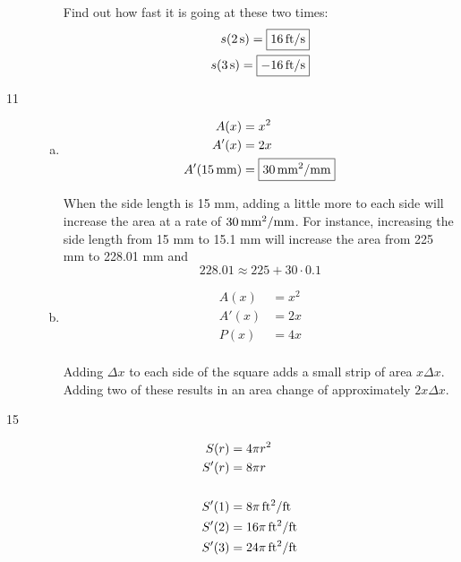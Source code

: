 \documentclass[letterpaper, landscape]{exam}
\begin{document}
\begin{description}
\begin{enumerate}[(a)]
          Find out how fast it is going at these two times:
          \begin{align*}
            s(\unit[2]{s}) = \boxed{ \unit[16]{ft/s} } \\
            s(\unit[3]{s}) = \boxed{ \unit[-16]{ft/s} } \\
          \end{align*}

      \end{enumerate}

    \item[11]
      \begin{enumerate}[(a)]
        \item 
          \begin{align*}
            A(x)              & = x^2 \\
            A'(x)             & = 2x \\
            A'(\unit[15]{mm}) & = \boxed{ \unit[30]{mm^2/mm} } \\
          \end{align*}

          When the side length is 15 mm, adding a little more to each side will increase the area at
          a rate of $\unit[30]{mm^2/mm}$. For instance, increasing the side length from 15 mm to
          15.1 mm will increase the area from 225 mm to 228.01 mm and 
          \[
            228.01 \approx 225 + 30 \cdot 0.1 
          \]
          
        \item
          \begin{align*}
            A(x)  & = x^2 \\
            A'(x) & = 2x \\
            P(x)  & = 4x \\
          \end{align*}

          Adding $\Delta x$ to each side of the square adds a small strip of area $x \Delta x$.
          Adding two of these results in an area change of approximately $2 x \Delta x$. 

      \end{enumerate}

    \item[15]
      \begin{align*}
        S(r)  & = 4 \pi r^2 \\
        S'(r) & = 8 \pi r \\
        \\
        S'(1) &= \unit[8 \pi]{ft^2/ft} \\
        S'(2) &= \unit[16 \pi]{ft^2/ft} \\
        S'(3) &= \unit[24 \pi]{ft^2/ft} \\
      \end{align*}


\end{description}
\end{document}
